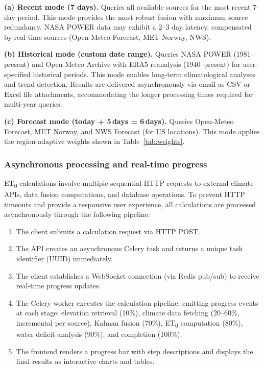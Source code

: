 \documentclass[preprint,review,12pt]{elsarticle}
\begin{document}
\textbf{(a) Recent mode (7 days).} Queries all available sources for the most
recent 7-day period. This mode provides the most robust fusion with maximum
source redundancy. NASA POWER data may exhibit a 2--3 day latency, compensated
by real-time sources (Open-Meteo Forecast, MET Norway, NWS).

\textbf{(b) Historical mode (custom date range).} Queries NASA POWER
(1981--present) and Open-Meteo Archive with ERA5 reanalysis (1940--present)
for user-specified historical periods. This mode enables long-term
climatological analyses and trend detection. Results are delivered
asynchronously via email as CSV or Excel file attachments, accommodating the
longer processing times required for multi-year queries.

\textbf{(c) Forecast mode (today + 5\,days = 6\,days).} Queries Open-Meteo
Forecast, MET Norway, and NWS Forecast (for US locations). This mode applies
the region-adaptive weights shown in Table~\ref{tab:weights}.

\subsubsection*{Asynchronous processing and real-time progress}

ET\textsubscript{0} calculations involve multiple sequential HTTP requests to
external climate APIs, data fusion computations, and database operations. To
prevent HTTP timeouts and provide a responsive user experience, all
calculations are processed asynchronously through the following pipeline:

\begin{enumerate}
\item The client submits a calculation request via HTTP POST.
\item The API creates an asynchronous Celery task and returns a unique task
  identifier (UUID) immediately.
\item The client establishes a WebSocket connection (via Redis pub/sub) to
  receive real-time progress updates.
\item The Celery worker executes the calculation pipeline, emitting progress
  events at each stage: elevation retrieval (10\%), climate data fetching
  (20--60\%, incremental per source), Kalman fusion (70\%), ET\textsubscript{0}
  computation (80\%), water deficit analysis (90\%), and completion (100\%).
\item The frontend renders a progress bar with step descriptions and displays
  the final results as interactive charts and tables.
\end{enumerate}
\end{document}
